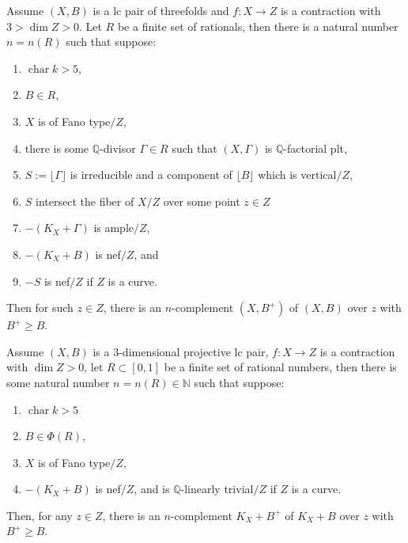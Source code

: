 \documentclass[10pt,a4paper]{amsart}
\DeclareMathOperator{\chara}{char}
\begin{document}
\begin{lemma}
\label{plrcomp}
    Assume $(X,B)$ is a lc pair of threefolds and $f:X\to Z$ is a contraction with  $3>\dim Z>0$. Let $R$ be a finite set of rationals, then there is a natural number $n=n(R)$ such that suppose:
    \begin{enumerate}
        \item $\chara k>5$,
        \item $B\in R$,
        \item $X$ is of Fano type$/Z$,
        \item there is some ${\mathbb Q}$-divisor $\Gamma\in R$ such that $(X,\Gamma)$ is ${\mathbb Q}$-factorial plt,
        \item $S:=\lfloor \Gamma\rfloor$ is irreducible and a component of $\lfloor B\rfloor$ which is vertical$/Z$,
        \item $S$ intersect the fiber of $X/Z$ over some point $z\in Z$
        \item $-(K_X+\Gamma)$ is ample$/Z$,
        \item $-(K_X+B)$ is nef$/Z$, and
        \item $-S$ is nef$/Z$ if $Z$ is a curve.
    \end{enumerate}
    Then for such $z\in Z$, there is an $n$-complement $(X,B^+)$ of $(X,B)$ over $z$ with $B^+\geq B$.
\end{lemma}

\begin{theorem}
\label{relacomp1}
    Assume $(X,B)$ is a 3-dimensional projective lc pair, $f:X\to Z$ is a contraction with $\dim Z>0$, let $R\subset [0,1]$ be a finite set of rational numbers, then there is some natural number $n=n(R)\in\mathbb N$ such that suppose:
    \begin{enumerate}
        \item $\chara k>5$
        \item $B\in\Phi(R)$,
        \item $X$ is of Fano type$/Z$,
        \item $-(K_X+B)$ is nef$/Z$, and is $\mathbb Q$-linearly trivial$/Z$ if $Z$ is a curve.
    \end{enumerate}
    Then, for any $z\in Z$, there is an $n$-complement $K_X+B^+$ of $K_X+B$ over $z$ with $B^+\geq B$.
\end{theorem}
\end{document}
